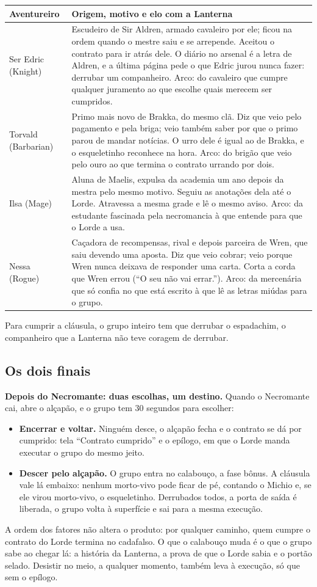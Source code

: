 \documentclass[11pt,a4paper]{article}
\begin{document}
\begin{xltabular}{\textwidth}{@{}lX@{}}
\toprule
\textbf{Aventureiro} & \textbf{Origem, motivo e elo com a Lanterna} \\
\midrule
Ser Edric (Knight) & Escudeiro de Sir Aldren, armado cavaleiro por ele; ficou na ordem quando o mestre saiu e se arrepende. Aceitou o contrato para ir atrás dele. O diário no arsenal é a letra de Aldren, e a última página pede o que Edric jurou nunca fazer: derrubar um companheiro. Arco: do cavaleiro que cumpre qualquer juramento ao que escolhe quais merecem ser cumpridos. \\
Torvald (Barbarian) & Primo mais novo de Brakka, do mesmo clã. Diz que veio pelo pagamento e pela briga; veio também saber por que o primo parou de mandar notícias. O urro dele é igual ao de Brakka, e o esqueletinho reconhece na hora. Arco: do brigão que veio pelo ouro ao que termina o contrato urrando por dois. \\
Ilsa (Mage) & Aluna de Maelis, expulsa da academia um ano depois da mestra pelo mesmo motivo. Seguiu as anotações dela até o Lorde. Atravessa a mesma grade e lê o mesmo aviso. Arco: da estudante fascinada pela necromancia à que entende para que o Lorde a usa. \\
Nessa (Rogue) & Caçadora de recompensas, rival e depois parceira de Wren, que saiu devendo uma aposta. Diz que veio cobrar; veio porque Wren nunca deixava de responder uma carta. Corta a corda que Wren errou (``O seu não vai errar.''). Arco: da mercenária que só confia no que está escrito à que lê as letras miúdas para o grupo. \\
\bottomrule
\end{xltabular}

Para cumprir a cláusula, o grupo inteiro tem que derrubar o espadachim, o companheiro que a Lanterna não teve coragem de derrubar.

\subsection{Os dois finais}

\textbf{Depois do Necromante: duas escolhas, um destino.} Quando o Necromante cai, abre o alçapão, e o grupo tem 30 segundos para escolher:
\begin{itemize}
    \item \textbf{Encerrar e voltar.} Ninguém desce, o alçapão fecha e o contrato se dá por cumprido: tela ``Contrato cumprido'' e o epílogo, em que o Lorde manda executar o grupo do mesmo jeito.
    \item \textbf{Descer pelo alçapão.} O grupo entra no calabouço, a fase bônus. A cláusula vale lá embaixo: nenhum morto-vivo pode ficar de pé, contando o Michio e, se ele virou morto-vivo, o esqueletinho. Derrubados todos, a porta de saída é liberada, o grupo volta à superfície e sai para a mesma execução.
\end{itemize}
A ordem dos fatores não altera o produto: por qualquer caminho, quem cumpre o contrato do Lorde termina no cadafalso. O que o calabouço muda é o que o grupo sabe ao chegar lá: a história da Lanterna, a prova de que o Lorde sabia e o portão selado. Desistir no meio, a qualquer momento, também leva à execução, só que sem o epílogo.
\end{document}
